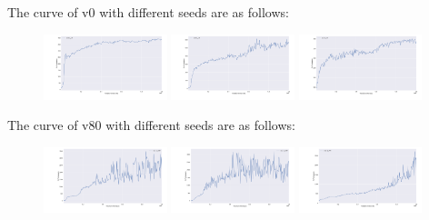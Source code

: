 \begin{homeworkProblem}
\begin{itemize}
    The curve of v0 with different seeds are as follows:
    \begin{figure}[H]
        \centering
        \includegraphics[width=0.32\textwidth]{../Img/spinningup_exercises/2_1/2_1_curve_v0_s0.png}
        \includegraphics[width=0.32\textwidth]{../Img/spinningup_exercises/2_1/2_1_curve_v0_s10.png}
        \includegraphics[width=0.32\textwidth]{../Img/spinningup_exercises/2_1/2_1_curve_v0_s20.png}
    \end{figure}

    The curve of v80 with different seeds are as follows:
    \begin{figure}[H]
        \centering
        \includegraphics[width=0.32\textwidth]{../Img/spinningup_exercises/2_1/2_1_curve_v80_s0.png}
        \includegraphics[width=0.32\textwidth]{../Img/spinningup_exercises/2_1/2_1_curve_v80_s10.png}
        \includegraphics[width=0.32\textwidth]{../Img/spinningup_exercises/2_1/2_1_curve_v80_s20.png}
    \end{figure}


\end{itemize}
\end{homeworkProblem}

